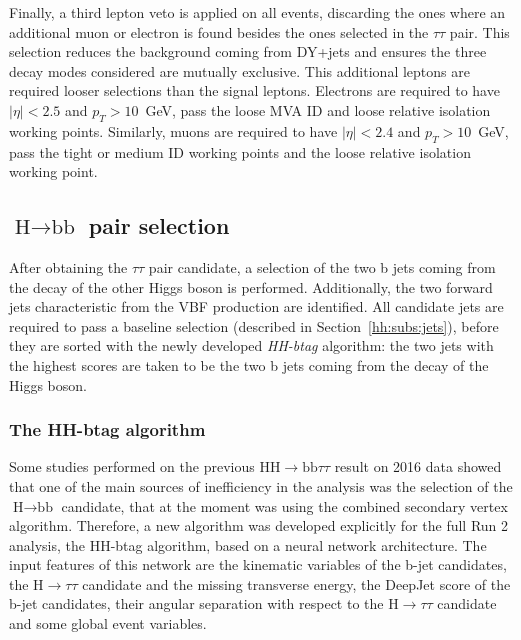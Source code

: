 \documentclass[../main.tex]{subfiles}
\begin{document}
Finally, a third lepton veto is applied on all events, discarding the ones where an additional muon or electron is found besides the ones selected in the $\tau\tau$ pair. This selection reduces the background coming from DY+jets and ensures the three \tauh\tauh{} decay modes considered are mutually exclusive. This additional leptons are required looser selections than the signal leptons. Electrons are required to have $|\eta| < 2.5$ and $p_T > 10$~GeV, pass the loose MVA ID and loose relative isolation working points. Similarly, muons are required to have $|\eta| < 2.4$ and $p_T > 10$~GeV, pass the tight or medium ID working points and the loose relative isolation working point.













\subsection{$\text{H}\to\text{bb}$ pair selection}
\label{hh:sec:hbb}

After obtaining the $\tau\tau$ pair candidate, a selection of the two b jets coming from the decay of the other Higgs boson is performed. Additionally, the two forward jets characteristic from the VBF production are identified. All candidate jets are required to pass a baseline selection (described in Section~\ref{hh:subs:jets}), before they are sorted with the newly developed \textit{HH-btag} algorithm: the two jets with the highest scores are taken to be the two b jets coming from the decay of the Higgs boson.

\subsubsection{The HH-btag algorithm}

Some studies performed on the previous $\text{HH}\to\text{bb}\tau\tau$ result on 2016 data \cite{hh:analysis:2016} showed that one of the main sources of inefficiency in the analysis was the selection of the $\text{H}\to\text{bb}$ candidate, that at the moment was using the combined secondary vertex \cite{hh:analysis:sv} algorithm. Therefore, a new algorithm was developed explicitly for the full Run 2 analysis, the HH-btag algorithm, based on a neural network architecture. The input features of this network are the kinematic variables of the b-jet candidates, the $\text{H}\to\tau\tau$ candidate and the missing transverse energy, the DeepJet score of the b-jet candidates, their angular separation with respect to the $\text{H}\to\tau\tau$ candidate and some global event variables.
\end{document}
